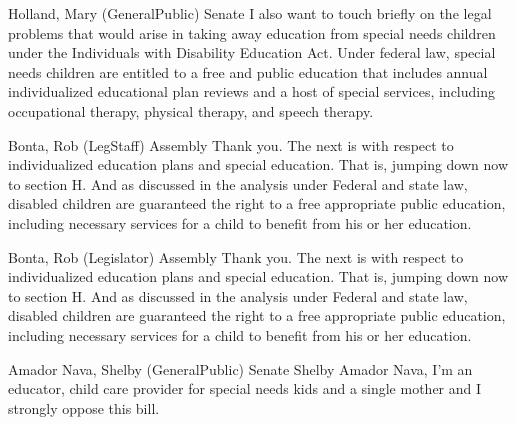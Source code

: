 \begin{result}{12.771668141654398}{Holland, Mary (GeneralPublic) Senate}
I also want to touch briefly on the legal problems that would arise in taking away education from special needs children under the Individuals with Disability Education Act. Under federal law, special needs children are entitled to a free and public education that includes annual individualized educational plan reviews and a host of special services, including occupational therapy, physical therapy, and speech therapy.
\end{result}

\begin{result}{11.435643821597985}{Bonta, Rob (LegStaff) Assembly}
Thank you. The next is with respect to individualized education plans and special education. That is, jumping down now to section H. And as discussed in the analysis under Federal and state law, disabled children are guaranteed the right to a free appropriate public education, including necessary services for a child to benefit from his or her education.
\end{result}

\begin{result}{11.435643821597985}{Bonta, Rob (Legislator) Assembly}
Thank you. The next is with respect to individualized education plans and special education. That is, jumping down now to section H. And as discussed in the analysis under Federal and state law, disabled children are guaranteed the right to a free appropriate public education, including necessary services for a child to benefit from his or her education.
\end{result}

\begin{result}{10.608660701613644}{Amador Nava, Shelby (GeneralPublic) Senate}
Shelby Amador Nava, I'm an educator, child care provider for special needs kids and a single mother and I strongly oppose this bill.
\end{result}

